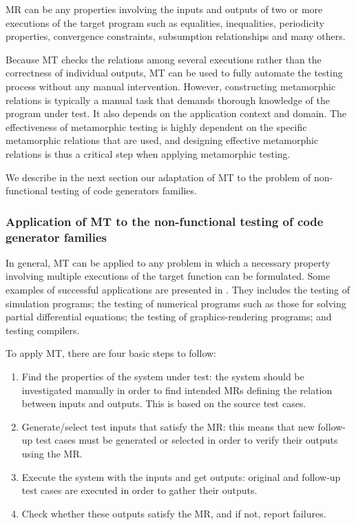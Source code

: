 MR can be any properties involving the inputs and outputs of two or more executions of the target program such as equalities, inequalities, periodicity properties, convergence constraints, subsumption relationships and many others. 

Because MT checks the relations among several executions rather than the correctness of individual outputs, MT can be used to fully automate the testing process without any manual intervention. 
However, constructing metamorphic relations is typically a manual task that demands thorough knowledge of the program under test. It also depends on the application context and domain. 
The effectiveness of metamorphic testing is highly dependent on the specific metamorphic relations that are used, and designing effective metamorphic relations is thus a critical step when applying metamorphic testing.

We describe in the next section our adaptation of MT to the problem of non-functional testing of code generators families.

\subsubsection{Application of MT to the non-functional testing of code generator families}
In general, MT can be applied to any problem in which a necessary property involving multiple executions of the target function can be formulated. Some examples of successful applications are presented in \cite{zhou2004metamorphic}. They includes the testing of simulation programs; the testing of numerical programs such as those for solving partial differential equations; the testing of graphics-rendering programs; and testing compilers.

To apply MT, there are four basic steps to follow:

\begin{enumerate}
 \item Find the properties of the system under test: the system should be investigated manually in order to find intended MRs defining the relation between inputs and outputs. This is based on the source test cases.
 \item Generate/select test inputs that satisfy the MR: this means that new follow-up test cases must be generated or selected in order to verify their outputs using the MR.
 \item Execute the system with the inputs and get outputs: original and follow-up test cases are executed in order to gather their outputs.
 \item Check whether these outputs satisfy the MR, and if not, report failures.
\end{enumerate}

